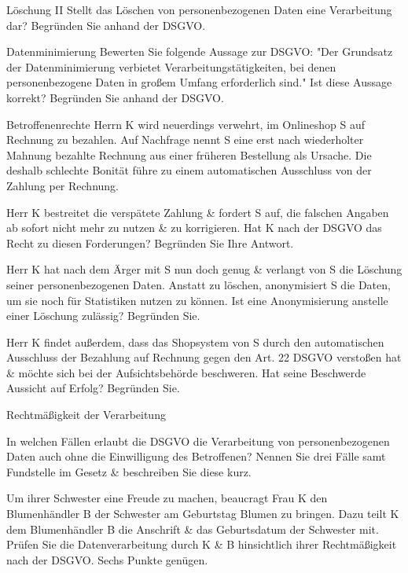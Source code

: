 \documentclass{exercisesheet}
\begin{document}
\begin{exercise}{Löschung II}
  Stellt das Löschen von personenbezogenen Daten eine Verarbeitung dar? Begründen Sie anhand der DSGVO.
\end{exercise}

\begin{exercise}{Datenminimierung}
  Bewerten Sie folgende Aussage zur DSGVO: "Der Grundsatz der Datenminimierung verbietet Verarbeitungstätigkeiten, bei denen personenbezogene Daten in großem Umfang erforderlich sind." Ist diese Aussage korrekt? Begründen Sie anhand der DSGVO.
\end{exercise}

\begin{exercise*}{Betroffenenrechte}{
    Herrn K wird neuerdings verwehrt, im Onlineshop S auf Rechnung zu bezahlen. Auf Nachfrage nennt S eine erst nach wiederholter Mahnung bezahlte Rechnung aus einer früheren Bestellung als Ursache. Die deshalb schlechte Bonität führe zu einem automatischen Ausschluss von der Zahlung per Rechnung.
  }
  \item Herr K bestreitet die verspätete Zahlung \& fordert S auf, die falschen Angaben ab sofort nicht mehr zu nutzen \& zu korrigieren. Hat K nach der DSGVO das Recht zu diesen Forderungen? Begründen Sie Ihre Antwort.
  \item Herr K hat nach dem Ärger mit S nun doch genug \& verlangt von S die Löschung seiner personenbezogenen Daten. Anstatt zu löschen, anonymisiert S die Daten, um sie noch für Statistiken nutzen zu können. Ist eine Anonymisierung anstelle einer Löschung zulässig? Begründen Sie.
  \item Herr K findet außerdem, dass das Shopsystem von S durch den automatischen Ausschluss der Bezahlung auf Rechnung gegen den Art. 22 DSGVO verstoßen hat \& möchte sich bei der Aufsichtsbehörde beschweren. Hat seine Beschwerde Aussicht auf Erfolg? Begründen Sie.
\end{exercise*}

\begin{exercise**}{Rechtmäßigkeit der Verarbeitung}
  \item In welchen Fällen erlaubt die DSGVO die Verarbeitung von personenbezogenen Daten auch ohne die Einwilligung des Betroffenen? Nennen Sie drei Fälle samt Fundstelle im Gesetz \& beschreiben Sie diese kurz.
  \item Um ihrer Schwester eine Freude zu machen, beaucragt Frau K den Blumenhändler B der Schwester am Geburtstag Blumen zu bringen. Dazu teilt K dem Blumenhändler B die Anschrift \& das Geburtsdatum der Schwester mit. Prüfen Sie die Datenverarbeitung durch K \& B hinsichtlich ihrer Rechtmäßigkeit nach der DSGVO. Sechs Punkte genügen.
\end{exercise**}
\end{document}
